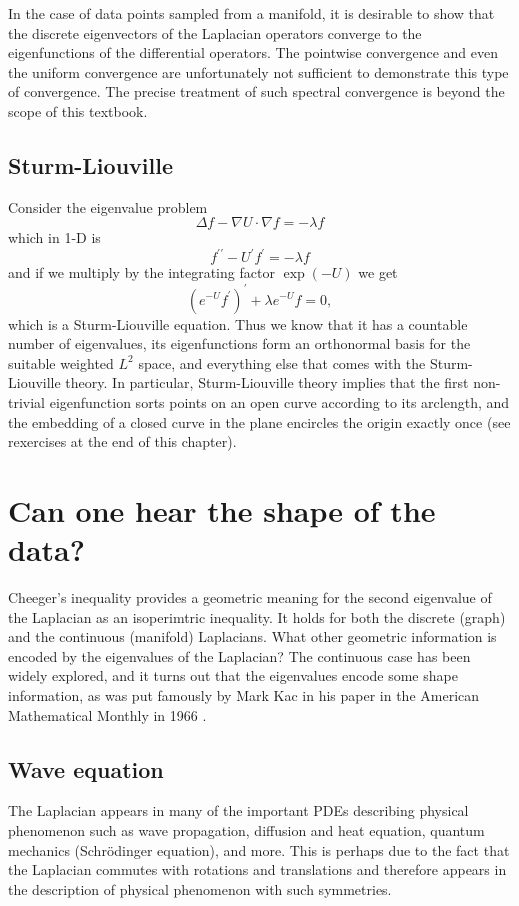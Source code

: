 In the case of data points sampled from a manifold, it is desirable to show that the discrete eigenvectors of the Laplacian operators converge to the eigenfunctions of the differential operators. The pointwise convergence and even the uniform convergence are unfortunately not sufficient to demonstrate this type of convergence. The precise treatment of such spectral convergence is beyond the scope of this textbook.  


\subsection{Sturm-Liouville}
Consider the eigenvalue problem
\[
\Delta f - \nabla U \cdot \nabla f = -\lambda f
\]
which in 1-D is
\[
f^{\prime \prime} - U^\prime f^\prime = -\lambda f
\]
and if we multiply by the integrating factor $\exp(-U)$ we get 
\[
(e^{-U} f^\prime)^\prime + \lambda e^{-U} f = 0,
\]
which is a Sturm-Liouville equation.
Thus we know that it has a countable number of eigenvalues, its eigenfunctions form an orthonormal basis for the suitable weighted $L^2$ space, and everything else that comes with the Sturm-Liouville theory. In particular, Sturm-Liouville theory implies that the first non-trivial eigenfunction sorts points on an open curve according to its arclength, and the embedding of a closed curve in the plane encircles the origin exactly once (see rexercises at the end of this chapter).  

\section{Can one hear the shape of the data?}
Cheeger's inequality provides a geometric meaning for the second eigenvalue of the Laplacian as an isoperimtric inequality. It holds for both the discrete (graph) and the continuous (manifold) Laplacians. What other geometric information is encoded by the eigenvalues of the Laplacian? The continuous case has been widely explored, and it turns out that the eigenvalues encode some shape information, as was put famously by Mark Kac in his paper in the American Mathematical Monthly in 1966 \cite{kac1966}.

\subsection{Wave equation}
The Laplacian appears in many of the important PDEs describing physical phenomenon such as wave propagation, diffusion and heat equation, quantum mechanics (Schr\"odinger equation), and more. This is perhaps due to the fact that the Laplacian commutes with rotations and translations and therefore appears in the description of physical phenomenon with such symmetries.

